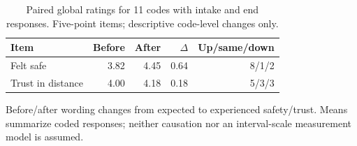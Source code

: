 \begin{table}[t]
\centering
\caption{Paired global ratings for 11 codes with intake and end responses. Five-point items; descriptive code-level changes only.}
\label{tab:global}
\footnotesize
\begin{tabular}{lrrrr}
\toprule
Item & Before & After & $\Delta$ & Up/same/down \\
\midrule
Felt safe & 3.82 & 4.45 & 0.64 & 8/1/2 \\
Trust in distance & 4.00 & 4.18 & 0.18 & 5/3/3 \\
\bottomrule
\end{tabular}
\par\smallskip\begin{minipage}{\linewidth}\footnotesize Before/after wording changes from expected to experienced safety/trust. Means summarize coded responses; neither causation nor an interval-scale measurement model is assumed.\end{minipage}
\end{table}
